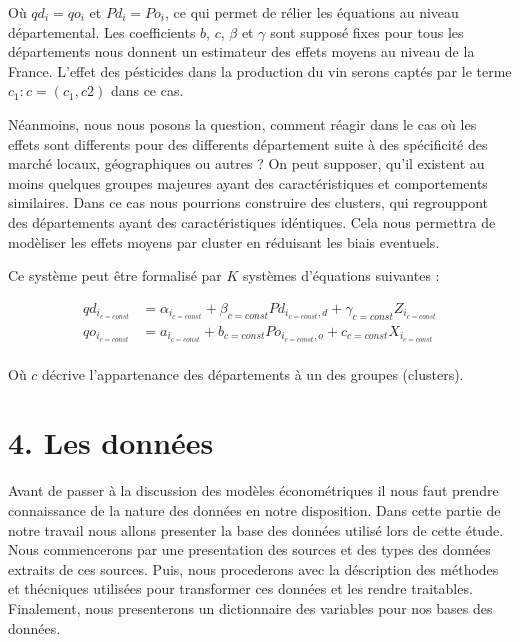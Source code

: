 \documentclass[11pt,]{article}
\begin{document}
Où \(qd_i = qo_i\) et \(Pd_i = Po_i\), ce qui permet de rélier les
équations au niveau départemental. Les coefficients \(b\), \(c\),
\(\beta\) et \(\gamma\) sont supposé fixes pour tous les départements
nous donnent un estimateur des effets moyens au niveau de la France.
L'effet des pésticides dans la production du vin serons captés par le
terme \(c_{1} : c = (c_{1}, c{2})\) dans ce cas.

Néanmoins, nous nous posons la question, comment réagir dans le cas où
les effets sont differents pour des differents département suite à des
spécificité des marché locaux, géographiques ou autres ? On peut
supposer, qu'il existent au moins quelques groupes majeures ayant des
caractéristiques et comportements similaires. Dans ce cas nous pourrions
construire des clusters, qui regrouppont des départements ayant des
caractéristiques idéntiques. Cela nous permettra de modèliser les effets
moyens par cluster en réduisant les biais eventuels.

Ce système peut être formalisé par \(K\) systèmes d'équations suivantes
:

\begin{align*}
  qd_{i_{c = const}} & = \alpha_{i_{c = const}} + \beta_{c = const} Pd_{i_{c = const},d} + \gamma_{c = const} Z_{i_{c = const}} \\
  qo_{i_{c = const}} & = a_{i_{c = const}} + b_{c = const} Po_{i_{c = const},o} + c_{c = const} X_{i_{c = const}} \\ 
\end{align*}

Où \(c\) décrive l'appartenance des départements à un des groupes
(clusters).

\hypertarget{les-donnees}{%
\section{4. Les données}\label{les-donnees}}

Avant de passer à la discussion des modèles économétriques il nous faut
prendre connaissance de la nature des données en notre disposition. Dans
cette partie de notre travail nous allons presenter la base des données
utilisé lors de cette étude. Nous commencerons par une presentation des
sources et des types des données extraits de ces sources. Puis, nous
procederons avec la déscription des méthodes et thécniques utilisées
pour transformer ces données et les rendre traitables. Finalement, nous
presenterons un dictionnaire des variables pour nos bases des données.
\end{document}
